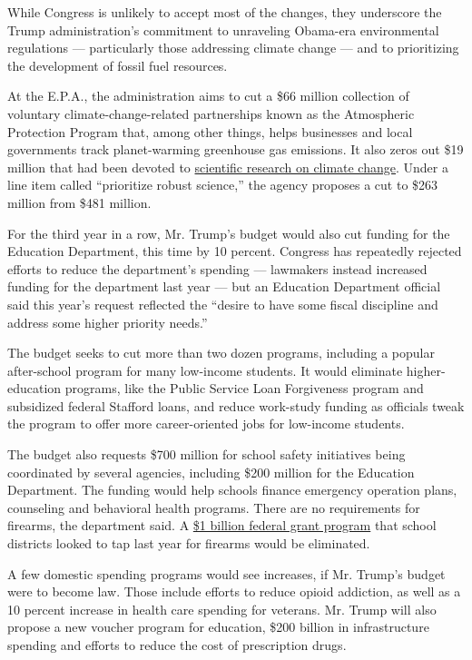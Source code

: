 While Congress is unlikely to accept most of the changes, they
underscore the Trump administration's commitment to unraveling Obama-era
environmental regulations --- particularly those addressing climate
change --- and to prioritizing the development of fossil fuel resources.

At the E.P.A., the administration aims to cut a \$66 million collection
of voluntary climate-change-related partnerships known as the
Atmospheric Protection Program that, among other things, helps
businesses and local governments track planet-warming greenhouse gas
emissions. It also zeros out \$19 million that had been devoted to
\href{https://www.epa.gov/sites/production/files/2019-03/documents/fy-2020-epa-bib.pdf}{scientific
research on climate change}. Under a line item called ``prioritize
robust science,'' the agency proposes a cut to \$263 million from \$481
million.

For the third year in a row, Mr. Trump's budget would also cut funding
for the Education Department, this time by 10 percent. Congress has
repeatedly rejected efforts to reduce the department's spending ---
lawmakers instead increased funding for the department last year --- but
an Education Department official said this year's request reflected the
``desire to have some fiscal discipline and address some higher priority
needs.''

The budget seeks to cut more than two dozen programs, including a
popular after-school program for many low-income students. It would
eliminate higher-education programs, like the Public Service Loan
Forgiveness program and subsidized federal Stafford loans, and reduce
work-study funding as officials tweak the program to offer more
career-oriented jobs for low-income students.

The budget also requests \$700 million for school safety initiatives
being coordinated by several agencies, including \$200 million for the
Education Department. The funding would help schools finance emergency
operation plans, counseling and behavioral health programs. There are no
requirements for firearms, the department said. A
\href{https://www.nytimes3xbfgragh.onion/2018/08/23/us/politics/devos-guns-in-schools.html}{\$1
billion federal grant program} that school districts looked to tap last
year for firearms would be eliminated.

A few domestic spending programs would see increases, if Mr. Trump's
budget were to become law. Those include efforts to reduce opioid
addiction, as well as a 10 percent increase in health care spending for
veterans. Mr. Trump will also propose a new voucher program for
education, \$200 billion in infrastructure spending and efforts to
reduce the cost of prescription drugs.

